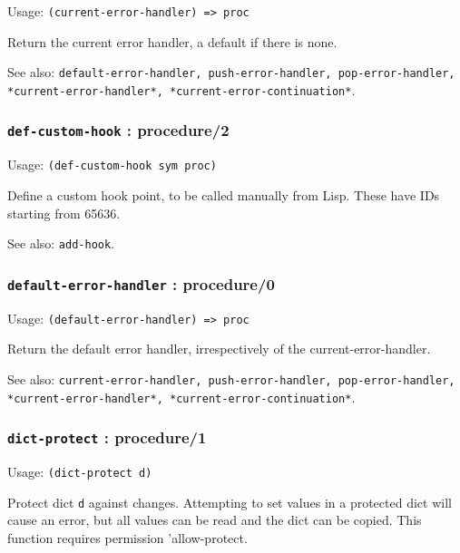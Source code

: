 \documentclass[
]{article}
\newcommand{\passthrough}[1]{#1}
\begin{document}
Usage: \passthrough{\lstinline!(current-error-handler) => proc!}

Return the current error handler, a default if there is none.

See also:
\passthrough{\lstinline!default-error-handler, push-error-handler, pop-error-handler, *current-error-handler*, *current-error-continuation*!}.

\hypertarget{def-custom-hook-procedure2}{%
\subsubsection{\texorpdfstring{\texttt{def-custom-hook} :
procedure/2}{def-custom-hook : procedure/2}}\label{def-custom-hook-procedure2}}

Usage: \passthrough{\lstinline!(def-custom-hook sym proc)!}

Define a custom hook point, to be called manually from Lisp. These have
IDs starting from 65636.

See also: \passthrough{\lstinline!add-hook!}.

\hypertarget{default-error-handler-procedure0}{%
\subsubsection{\texorpdfstring{\texttt{default-error-handler} :
procedure/0}{default-error-handler : procedure/0}}\label{default-error-handler-procedure0}}

Usage: \passthrough{\lstinline!(default-error-handler) => proc!}

Return the default error handler, irrespectively of the
current-error-handler.

See also:
\passthrough{\lstinline!current-error-handler, push-error-handler, pop-error-handler, *current-error-handler*, *current-error-continuation*!}.

\hypertarget{dict-protect-procedure1}{%
\subsubsection{\texorpdfstring{\texttt{dict-protect} :
procedure/1}{dict-protect : procedure/1}}\label{dict-protect-procedure1}}

Usage: \passthrough{\lstinline!(dict-protect d)!}

Protect dict \passthrough{\lstinline!d!} against changes. Attempting to
set values in a protected dict will cause an error, but all values can
be read and the dict can be copied. This function requires permission
'allow-protect.
\end{document}
